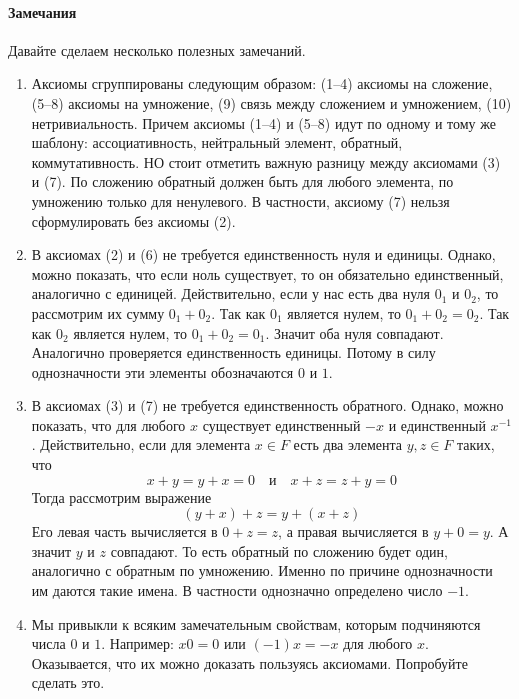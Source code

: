 \paragraph{Замечания}

Давайте сделаем несколько полезных замечаний.
\begin{enumerate}
\item Аксиомы сгруппированы следующим образом: (1--4) аксиомы на сложение, (5--8) аксиомы на умножение, (9) связь между сложением и умножением, (10) нетривиальность.
Причем аксиомы (1--4) и (5--8) идут по одному и тому же шаблону: ассоциативность, нейтральный элемент, обратный, коммутативность.
НО стоит отметить важную разницу между аксиомами (3) и (7).
По сложению обратный должен быть для любого элемента, по умножению только для ненулевого.
В частности, аксиому (7) нельзя сформулировать без аксиомы (2).

\item В аксиомах (2) и (6) не требуется единственность нуля и единицы.
Однако, можно показать, что если ноль существует, то он обязательно единственный, аналогично с единицей.
Действительно, если у нас есть два нуля $0_1$ и $0_2$, то рассмотрим их сумму $0_1 + 0_2$.
Так как $0_1$ является нулем, то $0_1 + 0_2 = 0_2$.
Так как $0_2$ является нулем, то $0_1 + 0_2 = 0_1$.
Значит оба нуля совпадают.
Аналогично проверяется единственность единицы.
Потому в силу однозначности эти элементы обозначаются $0$ и $1$.

\item В аксиомах (3) и (7) не требуется единственность обратного.
Однако, можно показать, что для любого $x$ существует единственный $-x$ и единственный $x^{-1}$.
Действительно, если для элемента $x\in F$ есть два элемента $y,z\in F$ таких, что
\[
x + y = y + x = 0\quad\text{и}\quad x + z = z + y = 0
\]
Тогда рассмотрим выражение
\[
(y + x) + z = y + (x + z)
\]
Его левая часть вычисляется в $0 + z = z$, а правая вычисляется в $y + 0  = y$.
А значит $y$ и $z$ совпадают.
То есть обратный по сложению будет один, аналогично с обратным по умножению.
Именно по причине однозначности им даются такие имена.
В частности однозначно определено число $-1$.

\item Мы привыкли к всяким замечательным свойствам, которым подчиняются числа $0$ и $1$.
Например: $x 0 = 0$ или $(-1)x = -x$ для любого $x$.
Оказывается, что их можно доказать пользуясь аксиомами.
Попробуйте сделать это.


\end{enumerate}
